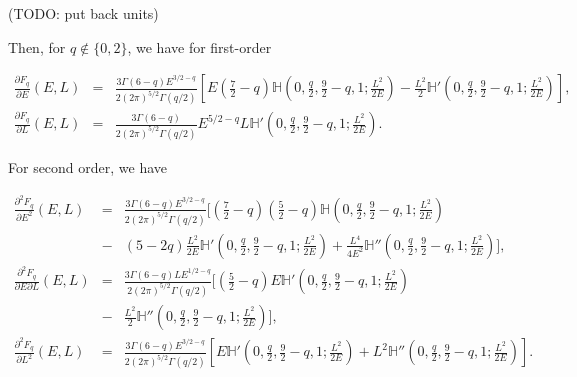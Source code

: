 \documentclass[11pt]{article}
\newcommand{\Fq}{F_{q}}
\newcommand{\mH}{\mathbb{H}}
\begin{document}
\begin{appendices}
(TODO: put back units)

Then, for $q \notin \{0,2\}$, we have for first-order

\begin{equation}
  \begin{array}{ccl}
    \displaystyle{\frac{\partial \Fq}{\partial E}(E,L)}&=&\displaystyle{\frac{3\Gamma(6-q)E^{3/2-q}}{2(2\pi)^{5/2}\Gamma(q/2)}\left[E\left(\frac{7}{2}-q\right)\mH(0,\frac{q}{2},\frac{9}{2}-q,1;\frac{L^{2}}{2E})-\frac{L^{2}}{2}\mH'(0,\frac{q}{2},\frac{9}{2}-q,1;\frac{L^{2}}{2E})\right]} ,\\

    \displaystyle{\frac{\partial \Fq}{\partial L}(E,L)} &=& \displaystyle{\frac{3\Gamma(6-q)}{2(2\pi)^{5/2}\Gamma(q/2)}E^{5/2-q}L\mH'(0,\frac{q}{2},\frac{9}{2}-q,1;\frac{L^{2}}{2E})} .
    \end{array}
\label{eq:d1F}
\end{equation}

For second order, we have

\begin{equation}
  \begin{array}{ccl}
    \displaystyle{\frac{\partial^{2}\Fq}{\partial E^{2}}(E,L)}&=&\displaystyle{\frac{3\Gamma(6-q)E^{3/2-q}}{2(2\pi)^{5/2}\Gamma(q/2)}\bigg[\left(\frac{7}{2}-q\right)\left(\frac{5}{2}-q\right)\mH(0,\frac{q}{2},\frac{9}{2}-q,1;\frac{L^{2}}{2E})} \\
      {}&-& \displaystyle{\left(5-2q\right)\frac{L^{2}}{2E}\mH'(0,\frac{q}{2},\frac{9}{2}-q,1;\frac{L^{2}}{2E})+\frac{L^{4}}{4E^{2}}\mH''(0,\frac{q}{2},\frac{9}{2}-q,1;\frac{L^{2}}{2E})\bigg]} ,\\

    \displaystyle{\frac{\partial^{2}\Fq}{\partial E\partial L}(E,L)} &=& \displaystyle{\frac{3\Gamma(6-q)LE^{1/2-q}}{2(2\pi)^{5/2}\Gamma(q/2)}\bigg[\left(\frac{5}{2}-q\right)E\mH'(0,\frac{q}{2},\frac{9}{2}-q,1;\frac{L^{2}}{2E})} \\
      {}&-& \displaystyle{\frac{L^{2}}{2}\mH''(0,\frac{q}{2},\frac{9}{2}-q,1;\frac{L^{2}}{2E})\bigg]} ,\\
    \displaystyle{\frac{\partial^{2}F_{q}}{\partial L^{2}}(E,L)}&=&\displaystyle{\frac{3\Gamma(6-q)E^{3/2-q}}{2(2\pi)^{5/2}\Gamma(q/2)}\left[E\mH'(0,\frac{q}{2},\frac{9}{2}-q,1;\frac{L^{2}}{2E})+L^{2}\mH''(0,\frac{q}{2},\frac{9}{2}-q,1;\frac{L^{2}}{2E})\right]} .
    \end{array}
\label{eq:d2F}
\end{equation}


\end{appendices}
\end{document}
